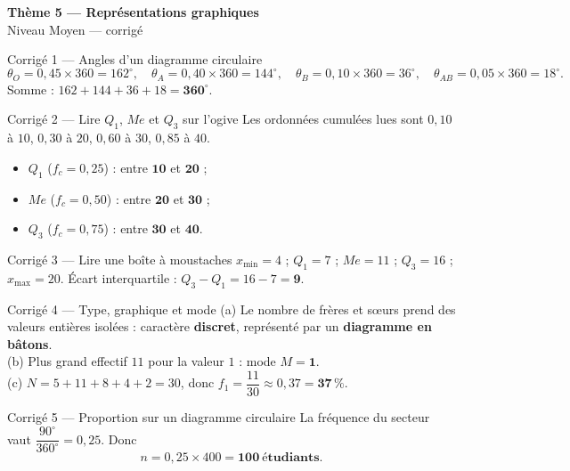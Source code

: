 \documentclass[11pt,a4paper]{article}
\newcommand{\bandeau}[2]{%
\begin{tcolorbox}[boxbase,colback=primary,colframe=primarydark,halign=center,
   before skip=2pt,after skip=12pt]
{\LARGE\bfseries\color{white} #1}\\[3pt]{\normalsize\color{white} #2}
\end{tcolorbox}}
\newcommand{\med}{M\!e}
\begin{document}
\bandeau{Thème 5 — Représentations graphiques}{Niveau Moyen — corrigé}

\begin{corbox}{Corrigé 1 — Angles d'un diagramme circulaire}
\[
\theta_O=0{,}45\times360=162^\circ,\quad \theta_A=0{,}40\times360=144^\circ,\quad
\theta_B=0{,}10\times360=36^\circ,\quad \theta_{AB}=0{,}05\times360=18^\circ.
\]
Somme : $162+144+36+18=\mathbf{360^\circ}$. \checkmark
\end{corbox}

\begin{corbox}{Corrigé 2 — Lire $Q_1$, $\med$ et $Q_3$ sur l'ogive}
Les ordonnées cumulées lues sont $0{,}10$ à $10$, $0{,}30$ à $20$, $0{,}60$ à $30$, $0{,}85$ à $40$.
\begin{itemize}
  \item $Q_1$ ($f_c=0{,}25$) : entre $\mathbf{10}$ et $\mathbf{20}$ ;
  \item $\med$ ($f_c=0{,}50$) : entre $\mathbf{20}$ et $\mathbf{30}$ ;
  \item $Q_3$ ($f_c=0{,}75$) : entre $\mathbf{30}$ et $\mathbf{40}$.
\end{itemize}
\end{corbox}

\begin{corbox}{Corrigé 3 — Lire une boîte à moustaches}
$x_{\min}=4$ ; $Q_1=7$ ; $\med=11$ ; $Q_3=16$ ; $x_{\max}=20$.
Écart interquartile : $Q_3-Q_1=16-7=\mathbf{9}$.
\end{corbox}

\begin{corbox}{Corrigé 4 — Type, graphique et mode}
(a) Le nombre de frères et sœurs prend des valeurs entières isolées : caractère \textbf{discret},
représenté par un \textbf{diagramme en bâtons}.\\
(b) Plus grand effectif $11$ pour la valeur $1$ : mode $M=\mathbf{1}$.\\
(c) $N=5+11+8+4+2=30$, donc $f_1=\dfrac{11}{30}\approx0{,}37=\mathbf{37\,\%}$.
\end{corbox}

\begin{corbox}{Corrigé 5 — Proportion sur un diagramme circulaire}
La fréquence du secteur vaut $\dfrac{90^\circ}{360^\circ}=0{,}25$. Donc
\[ n=0{,}25\times400=\mathbf{100\ \text{étudiants}}. \]
\end{corbox}
\end{document}
